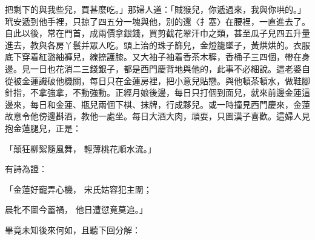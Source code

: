 把剩下的與我些兒，買甚麼吃。」那婦人道：「賊猴兒，你遞過來，我與你哄的。」玳安遞到他手裡，只掠了四五分一塊與他，別的還〈扌塞〉在腰裡，一直進去了。自此以後，常在門首，成兩價拿銀錢，買剪截花翠汗巾之類，甚至瓜子兒四五升量進去，教與各房丫鬟并眾人吃。頭上治的珠子篩兒，金燈籠墜子，黃烘烘的。衣服底下穿着紅潞紬褲兒，線捺護膝。又大袖子袖着香茶木穉，香桶子三四個，帶在身邊。見一日也花消二三錢銀子，都是西門慶背地與他的，此事不必細說。這老婆自從被金蓮識破他機關，每日只在金蓮房裡，把小意兒貼戀。與他頓茶頓水，做鞋腳針指，不拿強拿，不動強動。正經月娘後邊，每日只打個到面兒，就來前邊金蓮這邊來，每日和金蓮、瓶兒兩個下棋、抹牌，行成夥兒。或一時撞見西門慶來，金蓮故意令他傍邊斟酒，教他一處坐。每日大酒大肉，頑耍，只圖漢子喜歡。這婦人見抱金蓮腿兒，正是：

「顛狂柳絮隨風舞，  輕薄桃花順水流。」

有詩為證：

「金蓮好寵弄心機，  宋氏姑容犯主闈；

晨牝不圖今蓄禍，  他日遭愆竟莫追。」

畢竟未知後來何如，且聽下回分解：

